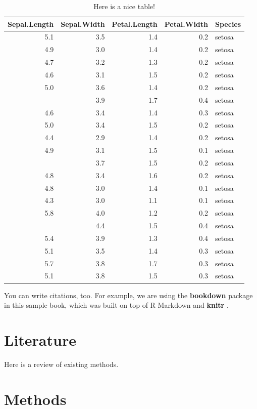 \documentclass[
]{book}
\begin{document}
\begin{table}

\caption{\label{tab:nice-tab}Here is a nice table!}
\centering
\begin{tabular}[t]{rrrrl}
\toprule
Sepal.Length & Sepal.Width & Petal.Length & Petal.Width & Species\\
\midrule
5.1 & 3.5 & 1.4 & 0.2 & setosa\\
4.9 & 3.0 & 1.4 & 0.2 & setosa\\
4.7 & 3.2 & 1.3 & 0.2 & setosa\\
4.6 & 3.1 & 1.5 & 0.2 & setosa\\
5.0 & 3.6 & 1.4 & 0.2 & setosa\\
\addlinespace
5.4 & 3.9 & 1.7 & 0.4 & setosa\\
4.6 & 3.4 & 1.4 & 0.3 & setosa\\
5.0 & 3.4 & 1.5 & 0.2 & setosa\\
4.4 & 2.9 & 1.4 & 0.2 & setosa\\
4.9 & 3.1 & 1.5 & 0.1 & setosa\\
\addlinespace
5.4 & 3.7 & 1.5 & 0.2 & setosa\\
4.8 & 3.4 & 1.6 & 0.2 & setosa\\
4.8 & 3.0 & 1.4 & 0.1 & setosa\\
4.3 & 3.0 & 1.1 & 0.1 & setosa\\
5.8 & 4.0 & 1.2 & 0.2 & setosa\\
\addlinespace
5.7 & 4.4 & 1.5 & 0.4 & setosa\\
5.4 & 3.9 & 1.3 & 0.4 & setosa\\
5.1 & 3.5 & 1.4 & 0.3 & setosa\\
5.7 & 3.8 & 1.7 & 0.3 & setosa\\
5.1 & 3.8 & 1.5 & 0.3 & setosa\\
\bottomrule
\end{tabular}
\end{table}

You can write citations, too. For example, we are using the \textbf{bookdown} package \citep{R-bookdown} in this sample book, which was built on top of R Markdown and \textbf{knitr} \citep{xie2015}.

\hypertarget{literature}{%
\chapter{Literature}\label{literature}}

Here is a review of existing methods.

\hypertarget{methods}{%
\chapter{Methods}\label{methods}}
\end{document}
